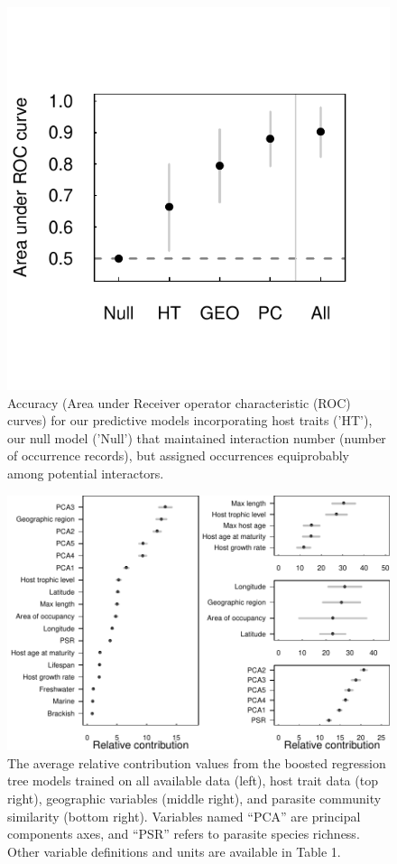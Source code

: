 \documentclass[12pt]{article}
\begin{document}
\begin{figure}[h!]
  \includegraphics[width=\textwidth]{Figures/brtAccuracy.pdf}
  \caption{Accuracy (Area under Receiver operator characteristic (ROC) curves) for our predictive models incorporating host traits ('HT'),  our null model ('Null') that maintained interaction number (number of occurrence records), but assigned occurrences equiprobably among potential interactors.}
 \label{fig:brtAccuracy}
 \end{figure}

\newpage
 \begin{figure}[h!]
  \includegraphics[width=\textwidth]{Figures/megaBRT.pdf}
  \caption{The average relative contribution values from the boosted regression tree models trained on all available data (left), host trait data (top right), geographic variables (middle right), and parasite community similarity (bottom right). Variables named ``PCA'' are principal components axes, and ``PSR'' refers to parasite species richness. Other variable definitions and units are available in Table 1. }
 \label{fig:megaBRT}
 \end{figure}
\end{document}
